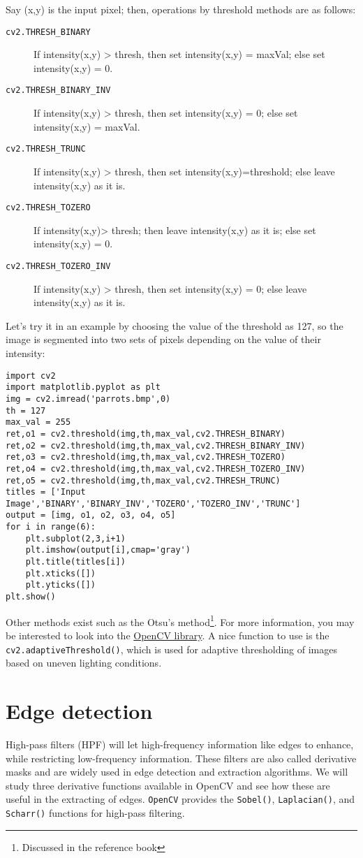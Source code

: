 \documentclass{labo}
\newcommand{\opencv}{\texttt{OpenCV} }
\begin{document}
Say (x,y) is the input pixel; then, operations by threshold methods are as follows:
\begin{description}
	\item[\texttt{cv2.THRESH\_BINARY}] If intensity(x,y) > thresh, then set intensity(x,y) = maxVal; else set intensity(x,y) = 0. 
	\item[\texttt{cv2.THRESH\_BINARY\_INV}] If intensity(x,y) > thresh, then set intensity(x,y) = 0; else set intensity(x,y) = maxVal.
	\item[\texttt{cv2.THRESH\_TRUNC}]  If intensity(x,y) > thresh, then set intensity(x,y)=threshold; else leave intensity(x,y) as it is.
	\item[\texttt{cv2.THRESH\_TOZERO}] If intensity(x,y)> thresh; then leave intensity(x,y) as it is; else set intensity(x,y) = 0.
	\item[\texttt{cv2.THRESH\_TOZERO\_INV}] If intensity(x,y) > thresh, then set intensity(x,y) = 0; else leave intensity(x,y) as it is.
\end{description}

Let’s try it in an example by choosing the value of the threshold as 127, so the image is segmented into two sets of pixels depending on the value of their intensity:

\begin{verbatim}
import cv2 
import matplotlib.pyplot as plt 
img = cv2.imread('parrots.bmp',0) 
th = 127 
max_val = 255 
ret,o1 = cv2.threshold(img,th,max_val,cv2.THRESH_BINARY) 
ret,o2 = cv2.threshold(img,th,max_val,cv2.THRESH_BINARY_INV) 
ret,o3 = cv2.threshold(img,th,max_val,cv2.THRESH_TOZERO) 
ret,o4 = cv2.threshold(img,th,max_val,cv2.THRESH_TOZERO_INV) 
ret,o5 = cv2.threshold(img,th,max_val,cv2.THRESH_TRUNC) 
titles = ['Input Image','BINARY','BINARY_INV','TOZERO','TOZERO_INV','TRUNC']
output = [img, o1, o2, o3, o4, o5] 
for i in range(6): 
	plt.subplot(2,3,i+1)
	plt.imshow(output[i],cmap='gray') 
	plt.title(titles[i]) 
	plt.xticks([])
	plt.yticks([]) 
plt.show()
\end{verbatim}

Other methods exist such as the Otsu’s method\footnote{Discussed in the reference book}. For more information, you may be interested to look into the \href{https://docs.opencv.org/4.x/d7/d4d/tutorial_py_thresholding.html}{OpenCV library}. A nice function to use is the \texttt{cv2.adaptiveThreshold()}, which is used for adaptive thresholding of images based on uneven lighting conditions.


\section*{Edge detection}
High-pass filters (HPF) will let high-frequency information like edges to enhance, while restricting low-frequency information. These filters are also called derivative masks and are widely used in edge detection and extraction algorithms. We will study three derivative functions available in OpenCV and see how these are useful in the extracting of edges. \opencv provides the \texttt{Sobel()}, \texttt{Laplacian()}, and \texttt{Scharr()} functions for high-pass filtering.\\
\end{document}
